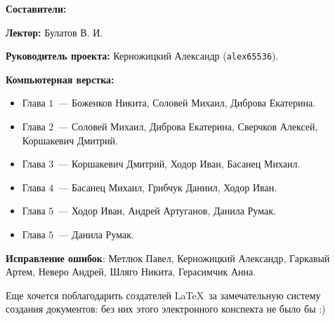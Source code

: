 \documentclass[../main.tex]{subfiles}
\begin{document}
{\Huge \bf Составители:}

\vspace{2em}

{
    \textbf{Лектор:} Булатов В. И.
    
    \smallskip
    
    \textbf{Руководитель проекта:} Керножицкий Александр 
    (\texttt{alex65536}).
    
    \smallskip
    
    \textbf{Компьютерная верстка:}
    \begin{itemize}
     \item Глава $1$~--- Боженков Никита, Соловей Михаил, Диброва Екатерина.
     \item Глава $2$~--- Соловей Михаил, Диброва Екатерина, Сверчков Алексей,
     Коршакевич Дмитрий.
     \item Глава $3$~--- Коршакевич Дмитрий, Ходор Иван, Басанец Михаил.
     \item Глава $4$~--- Басанец Михаил, Грибчук Даниил, Ходор Иван.
     \item Глава $5$~--- Ходор Иван, Андрей Артуганов, Данила Румак.
     \item Глава $5$~--- Данила Румак.
    \end{itemize}
    
    \textbf{Исправление ошибок}: Метлюк Павел, Керножицкий Александр, Гаркавый
    Артем, Неверо Андрей, Шляго Никита, Герасимчик Анна.
    
    
    \smallskip
    
    Еще хочется поблагодарить создателей \LaTeX\ за замечательную 
    систему создания документов: без них этого электронного 
    конспекта не было бы :)
}

\pagebreak
\end{document}

